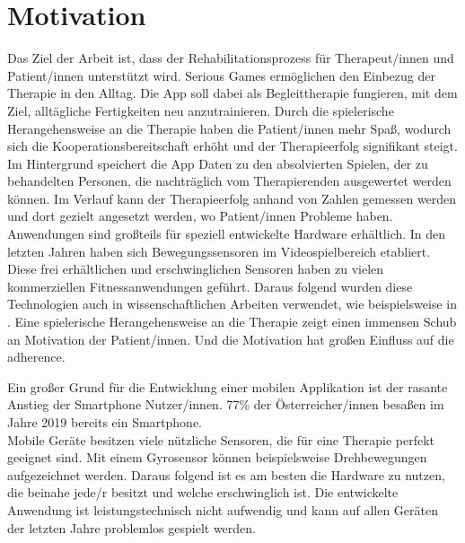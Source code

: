 \section{Motivation}
Das Ziel der Arbeit ist, dass der Rehabilitationsprozess für Therapeut/innen und Patient/innen unterstützt wird. Serious Games ermöglichen den Einbezug der Therapie in den Alltag. Die App soll dabei als Begleittherapie fungieren, mit dem Ziel, alltägliche Fertigkeiten neu anzutrainieren. Durch die spielerische Herangehensweise an die Therapie haben die Patient/innen mehr Spaß, wodurch sich die Kooperationsbereitschaft erhöht und der Therapieerfolg signifikant steigt. Im Hintergrund speichert die App Daten zu den absolvierten Spielen, der zu behandelten Personen, die nachträglich vom Therapierenden ausgewertet werden können. Im Verlauf kann der Therapieerfolg anhand von Zahlen gemessen werden und dort gezielt angesetzt werden, wo Patient/innen Probleme haben.
Anwendungen sind großteils für speziell entwickelte Hardware erhältlich. In den letzten Jahren haben sich Bewegungssensoren im Videospielbereich etabliert. Diese frei erhältlichen und erschwinglichen Sensoren haben zu vielen kommerziellen Fitnessanwendungen geführt. Daraus folgend wurden diese Technologien auch in wissenschaftlichen Arbeiten verwendet, wie beispielsweise in \cite{baranyi:reha_labyrinth:2013}\cite{rehab@home:2016}\cite{funabashi:agar:2017}\cite{stroke_patients_receive_home_rehabilitation:2016}.
Eine spielerische Herangehensweise an die Therapie zeigt einen immensen Schub an Motivation der Patient/innen. Und die Motivation hat großen Einfluss auf die \Gls{adherence}. \cite{burke:2009:optimising}

Ein großer Grund für die Entwicklung einer mobilen Applikation ist der rasante Anstieg der Smartphone Nutzer/innen. 77\% der Österreicher/innen besaßen im Jahre 2019 bereits ein Smartphone. \cite{smartphone_user:2019:austria} \\
Mobile Geräte besitzen viele nützliche Sensoren, die für eine Therapie perfekt geeignet sind. Mit einem Gyrosensor können beispielsweise Drehbewegungen aufgezeichnet werden. Daraus folgend ist es am besten die Hardware zu nutzen, die beinahe jede/r besitzt und welche erschwinglich ist. Die entwickelte Anwendung ist leistungstechnisch nicht aufwendig und kann auf allen Geräten der letzten Jahre problemlos gespielt werden.

